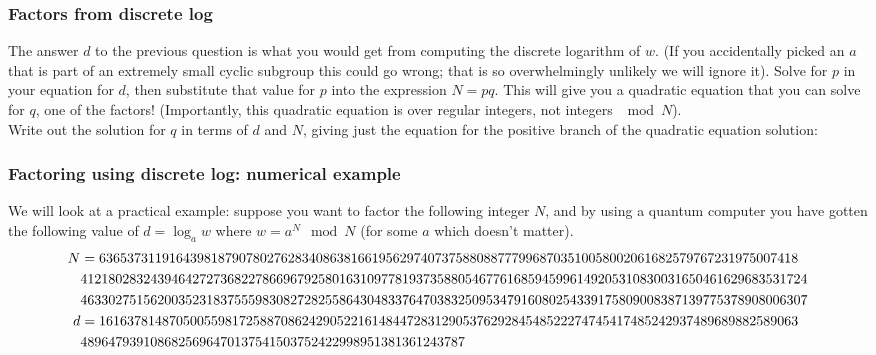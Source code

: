 \subsubsection{Factors from discrete log}
The answer $d$ to the previous question is what you would get from computing the discrete logarithm of $w$. (If you accidentally picked an $a$ that is part of an extremely small cyclic subgroup this could go wrong; that is so overwhelmingly unlikely we will ignore it). Solve for $p$ in your equation for $d$, then substitute that value for $p$ into the expression $N=pq$. This will give you a quadratic equation that you can solve for $q$, one of the factors! (Importantly, this quadratic equation is over regular integers, not integers $\mod N$). \\

Write out the solution for $q$ in terms of $d$ and $N$, giving just the equation for the positive branch of the quadratic equation solution:

\noindent{} 

\subsubsection{Factoring using discrete log: numerical example}
We will look at a practical example: suppose you want to factor the following integer $N$, and by using a quantum computer you have gotten the following value of $d = \log_a w$ where $w = a^N \mod N$ (for some $a$ which doesn't matter).
\begin{align}
    N&= 6365373119164398187907802762834086381661956297407375880887779968703510058002061682579767231975007418 \notag\\
    &41218028324394642727368227866967925801631097781937358805467761685945996149205310830031650461629683531724 \notag\\
    &46330275156200352318375559830827282558643048337647038325095347916080254339175809008387139775378908006307  \\
    d &= 1616378148705005598172588708624290522161484472831290537629284548522274745417485242937489689882589063 \notag \\
    &4896479391086825696470137541503752422998951381361243787
\end{align}

